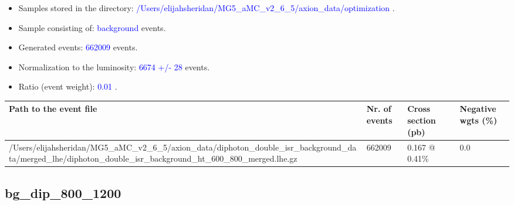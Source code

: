 \documentclass[a4paper, 10pt]{article}
\begin{document}
\begin{itemize}
  \item Samples stored in the directory: \textcolor{blue}{/\-Users/\-elijahsheridan/\-MG5\_aMC\_v2\_6\_5/\-axion\_data/\-optimization} .
   \item Sample consisting of: \textcolor{blue}{background}  events.
   \item Generated events: \textcolor{blue}{662009 }  events.
   \item Normalization to the luminosity: \textcolor{blue}{6674}\textcolor{blue}{ +/\-- }\textcolor{blue}{28 }  events.
   \item Ratio (event weight): \textcolor{blue}{0.01 } .  
 
\end{itemize}
\begin{table}[H]
  \begin{center}
    \begin{tabular}{|m{55.0mm}|m{25.0mm}|m{30.0mm}|m{30.0mm}|}
      \hline
      {\cellcolor{yellow}         Path to the event file}& {\cellcolor{yellow}         Nr. of events}& {\cellcolor{yellow}         Cross section (pb)}& {\cellcolor{yellow}         Negative wgts (\%)}\\
      \hline
      {\cellcolor{white}          /\-Users/\-elijahsheridan/\-MG5\_aMC\_v2\_6\_5/\-axion\_data/\-diphoton\_double\_isr\_background\_data/\-merged\_lhe/\-diphoton\_double\_isr\_background\_ht\_600\_800\_merged.lhe.gz}& {\cellcolor{white}          662009}& {\cellcolor{white}          0.167 @ 0.41\%}& {\cellcolor{white}          0.0}\\
\hline
    \end{tabular}
  \end{center}
\end{table}

\subsection{ bg\_dip\_800\_1200}
\end{document}
